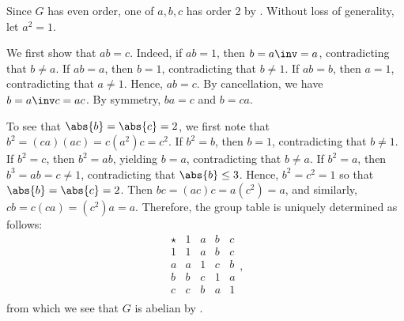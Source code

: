 \begin{sol}
    Since $G$ has even order, one of $a, b, c$ has order 2 by .
	Without loss of generality, let $a^2 = 1$.

    We first show that $ab = c$.
	Indeed, if $ab = 1$, then $b = a\inv = a$, contradicting that $b \neq a$.
	If $ab = a$, then $b = 1$, contradicting that $b \neq 1$.
	If $ab = b$, then $a = 1$, contradicting that $a \neq 1$.
	Hence, $ab = c$.
	By cancellation, we have $b = a\inv c = ac$.
	By symmetry, $ba = c$ and $b = ca$.

    To see that $\abs{b} = \abs{c} = 2$, we first note that $b^2 = (ca)(ac) = c(a^2)c = c^2$.
	If $b^2 = b$, then $b = 1$, contradicting that $b \neq 1$.
    If $b^2 = c$, then $b^2 = ab$, yielding $b = a$, contradicting that $b \neq a$.
    If $b^2 = a$, then $b^3 = ab = c \neq 1$, contradicting that $\abs{b} \leq 3$.
    Hence, $b^2 = c^2 = 1$ so that $\abs{b} = \abs{c} = 2$.
    Then $bc = (ac)c = a(c^2) = a$, and similarly, $cb = c(ca) = (c^2)a = a$.
	Therefore, the group table is uniquely determined as follows:
    \[
        \begin{array}{c|cccc}
            \star & 1 & a & b & c \\
            \hline
            1 & 1 & a & b & c \\
            a & a & 1 & c & b \\
            b & b & c & 1 & a \\
            c & c & b & a & 1 \\
        \end{array},
    \]
    from which we see that $G$ is abelian by .
\end{sol}